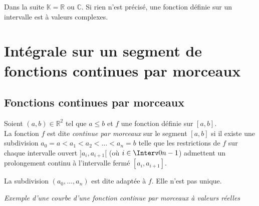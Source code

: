\documentclass[a4paper,10pt]{report}
\begin{document}


\noindent Dans la suite $\mathbb{K}= \mathbb{R}$ ou $\mathbb{C}$. Si rien n'est précisé, une fonction définie sur un intervalle est à valeurs complexes.

\section{Intégrale sur un segment de fonctions continues par morceaux}

\subsection{Fonctions continues par morceaux}

\begin{defin}
Soient $(a,b) \in \mathbb{R}^2$ tel que $a \leq b$ et $f$ une fonction définie sur $[a,b]$.\\
La fonction $f$ est dite \textit{continue par morceaux} sur le segment $[a,b]$ si il existe une subdivision \linebreak $a_0 = a < a_1 < a_2 < \dots < a_n =b$ telle que les restrictions de $f$ sur chaque intervalle ouvert $]a_i,a_{i+1}[$ (où $i \in \Interv0{n-1}$) admettent un prolongement continu à l'intervalle fermé $[a_i,a_{i+1}]$.
\end{defin}

\begin{rem} La subdivision $(a_0, \ldots, a_n)$ est dite adaptée à $f$. Elle n'est pas unique.
\end{rem}

\medskip

%
%
\begin{center}
\textit{Exemple d'une courbe d'une fonction continue par morceaux à valeurs réelles}
\end{center}

\begin{center}
\end{center}
\end{document}
